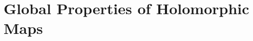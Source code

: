 \documentclass[../Moduli_Spaces_of_Riemann_Surfaces.tex]{subfiles}
\begin{document}
    \section{Global Properties of Holomorphic Maps}
\end{document}
